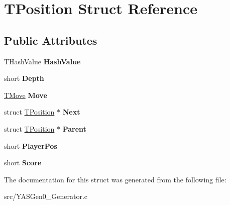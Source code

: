 \hypertarget{struct_t_position}{}\section{T\+Position Struct Reference}
\label{struct_t_position}
\subsection*{Public Attributes}
\begin{DoxyCompactItemize}
\item 
\mbox{\label{struct_t_position_a4fb452ae7ea056ff18eb1e76331311f1}} 
T\+Hash\+Value {\bfseries Hash\+Value}
\item 
\mbox{\label{struct_t_position_a5e8618341f837f247d943547de0c2f82}} 
short {\bfseries Depth}
\item 
\mbox{\label{struct_t_position_a440f9dfcc4de52dce972411fae26c068}} 
\hyperlink{struct_t_move}{T\+Move} {\bfseries Move}
\item 
\mbox{\label{struct_t_position_afc140eea0075329405cff78bb205637f}} 
struct \hyperlink{struct_t_position}{T\+Position} $\ast$ {\bfseries Next}
\item 
\mbox{\label{struct_t_position_a33dfb93baf834fe8c2b4f89a7949e6c0}} 
struct \hyperlink{struct_t_position}{T\+Position} $\ast$ {\bfseries Parent}
\item 
\mbox{\label{struct_t_position_a0bbcef674b1d53e0c41faf5f3361f934}} 
short {\bfseries Player\+Pos}
\item 
\mbox{\label{struct_t_position_a397ba101b4439a7658c9de695318df86}} 
short {\bfseries Score}
\end{DoxyCompactItemize}


The documentation for this struct was generated from the following file\+:\begin{DoxyCompactItemize}
\item 
src/Y\+A\+S\+Gen0\+\_\+\+Generator.\+c\end{DoxyCompactItemize}
